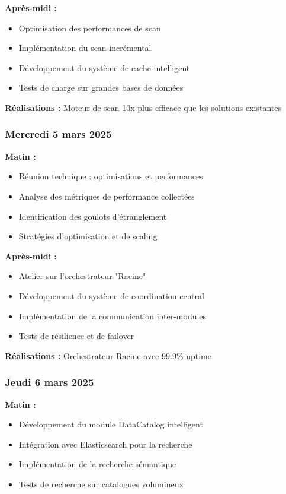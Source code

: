 \documentclass[a4paper,12pt]{article}
\begin{document}
\textbf{Après-midi :}
\begin{itemize}
    \item Optimisation des performances de scan
    \item Implémentation du scan incrémental
    \item Développement du système de cache intelligent
    \item Tests de charge sur grandes bases de données
\end{itemize}

\textbf{Réalisations :} Moteur de scan 10x plus efficace que les solutions existantes

\subsubsection*{Mercredi 5 mars 2025}
\textbf{Matin :}
\begin{itemize}
    \item Réunion technique : optimisations et performances
    \item Analyse des métriques de performance collectées
    \item Identification des goulots d'étranglement
    \item Stratégies d'optimisation et de scaling
\end{itemize}

\textbf{Après-midi :}
\begin{itemize}
    \item Atelier sur l'orchestrateur "Racine"
    \item Développement du système de coordination central
    \item Implémentation de la communication inter-modules
    \item Tests de résilience et de failover
\end{itemize}

\textbf{Réalisations :} Orchestrateur Racine avec 99.9\% uptime

\subsubsection*{Jeudi 6 mars 2025}
\textbf{Matin :}
\begin{itemize}
    \item Développement du module DataCatalog intelligent
    \item Intégration avec Elasticsearch pour la recherche
    \item Implémentation de la recherche sémantique
    \item Tests de recherche sur catalogues volumineux
\end{itemize}
\end{document}
